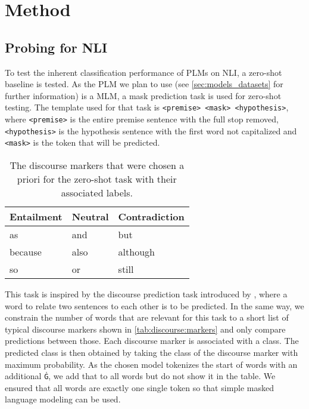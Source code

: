 \section{Method} \label{sec:method}
\subsection{Probing for \acs{NLI}} \label{sec:meth:probing}
To test the inherent classification performance of \acp{PLM} on \acs{NLI}, a zero-shot baseline is tested. As the \ac{PLM} we plan to use (see \autoref{sec:models_datasets} for further information) is a \ac{MLM}, a mask prediction task is used for zero-shot testing. The template used for that task is \texttt{<premise> <mask> <hypothesis>}, where \texttt{<premise>} is the entire premise sentence with the full stop removed, \texttt{<hypothesis>} is the hypothesis sentence with the first word not capitalized and \texttt{<mask>} is the token that will be predicted.

\begin{table}[ht]
    \centering
    \caption{The discourse markers that were chosen a priori for the zero-shot task with their associated labels.}
    \small
    \begin{tabular}{l | l | l}
        \multicolumn{1}{c|}{Entailment} & \multicolumn{1}{c|}{Neutral} & \multicolumn{1}{c}{Contradiction} \\
        \hline
        as & and  & but \\
        because & also & although \\
        so & or & still
    \end{tabular}
    \label{tab:discourse:markers}
\end{table}

This task is inspired by the discourse prediction task introduced by \cite{dissent}, where a word to relate two sentences to each other is to be predicted. In the same way, we constrain the number of words that are relevant for this task to a short list of typical discourse markers shown in \autoref{tab:discourse:markers} and only compare predictions between those. Each discourse marker is associated with a class. The predicted class is then obtained by taking the class of the discourse marker with maximum probability. As the chosen model tokenizes the start of words with an additional \texttt{Ġ}, we add that to all words but do not show it in the table. We ensured that all words are exactly one single token so that simple masked language modeling can be used.

